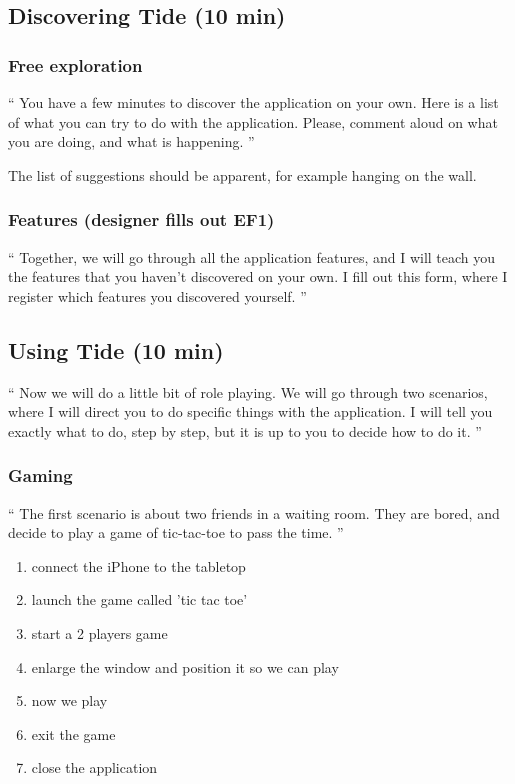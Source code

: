\subsection{Discovering Tide (10 min)}

\subsubsection{Free exploration}
 
``
You have a few minutes to discover the application on your own.
Here is a list of what you can try to do with the application.
Please, comment aloud on what you are doing, and what is happening.
''

The list of suggestions should be apparent, for example hanging on the wall.


\subsubsection{Features (designer fills out EF1)}

``
Together, we will go through all the application features, and I will teach you the features that you haven't discovered on your own.
I fill out this form, where I register which features you discovered yourself.
''

\subsection{Using Tide (10 min)}

``
Now we will do a little bit of role playing. We will go through two scenarios, where I will direct you to do specific things with the application.
I will tell you exactly what to do, step by step, but it is up to you to decide how to do it.
''

\subsubsection{Gaming}

``
The first scenario is about two friends in a waiting room. They are bored, and decide to play a game of tic-tac-toe to pass the time.
''

\begin{enumerate}
\item connect the iPhone to the tabletop
\item launch the game called 'tic tac toe'
\item start a 2 players game
\item enlarge the window and position it so we can play
\item now we play
\item exit the game
\item close the application
\end{enumerate}

